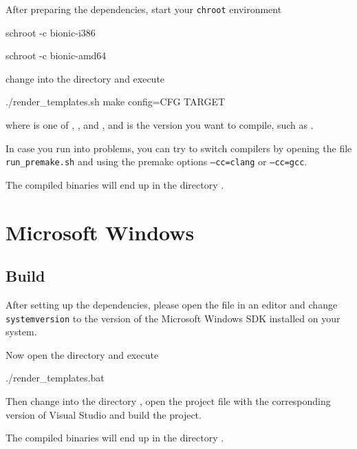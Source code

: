 After preparing the dependencies, start your \texttt{chroot}
environment

\begin{Verbatim32}
  schroot -c bionic-i386
\end{Verbatim32}

\begin{Verbatim64}
  schroot -c bionic-amd64
\end{Verbatim64}

change into the directory  and execute

\begin{VerbatimBoth}
  ./render_templates.sh
  make config=CFG TARGET
\end{VerbatimBoth}

where  is one of ,
,  and
, and  is the version
you want to compile, such as .

In case you run into problems, you can try to switch compilers by
opening the file \texttt{run\_premake.sh} and using the premake
options \texttt{--cc=clang} or \texttt{--cc=gcc}.

The compiled binaries will end up in the directory .

\section{Microsoft Windows}

\subsection{Build}

After setting up the dependencies, please open the file
 in an editor and change
\texttt{systemversion} to the version of the Microsoft Windows SDK
installed on your system.

Now open the directory  and execute

\begin{VerbatimBoth}
  ./render_templates.bat
\end{VerbatimBoth}

Then change into the directory , open the
project file with the corresponding version of Visual Studio and build
the project.

The compiled binaries will end up in the directory .

